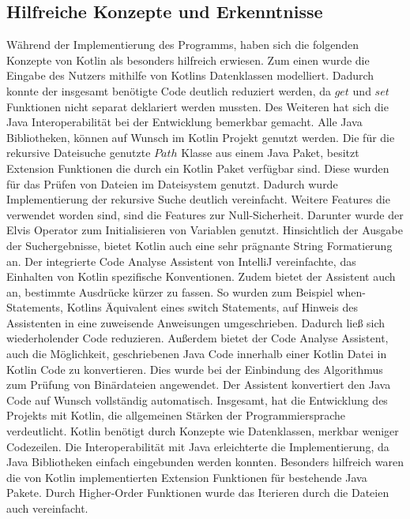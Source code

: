 \documentclass{article}
\begin{document}
\subsection{Hilfreiche Konzepte und Erkenntnisse}
Während der Implementierung des Programms, haben sich die folgenden Konzepte von Kotlin als besonders hilfreich erwiesen. Zum einen wurde die Eingabe des Nutzers mithilfe von Kotlins Datenklassen modelliert. Dadurch konnte der insgesamt benötigte Code deutlich reduziert werden, da $get$ und $set$ Funktionen nicht separat deklariert werden mussten. Des Weiteren hat sich die Java Interoperabilität bei der Entwicklung bemerkbar gemacht. Alle Java Bibliotheken, können auf Wunsch im Kotlin Projekt genutzt werden. Die für die rekursive Dateisuche genutzte $Path$ Klasse aus einem Java Paket, besitzt Extension Funktionen die durch ein Kotlin Paket verfügbar sind. Diese wurden für das Prüfen von Dateien im Dateisystem genutzt. Dadurch wurde Implementierung der rekursive Suche deutlich vereinfacht. Weitere Features die verwendet worden sind, sind die Features zur Null-Sicherheit. Darunter wurde der Elvis Operator zum Initialisieren von Variablen genutzt. Hinsichtlich der Ausgabe der Suchergebnisse, bietet Kotlin auch eine sehr prägnante String Formatierung an. \newline
Der integrierte Code Analyse Assistent von IntelliJ vereinfachte, das Einhalten von Kotlin spezifische Konventionen. Zudem bietet der Assistent auch an, bestimmte Ausdrücke kürzer zu fassen. So wurden zum Beispiel when-Statements, Kotlins Äquivalent eines switch Statements, auf Hinweis des Assistenten in eine zuweisende Anweisungen umgeschrieben. Dadurch ließ sich wiederholender Code reduzieren. Außerdem bietet der Code Analyse Assistent, auch die Möglichkeit, geschriebenen Java Code innerhalb einer Kotlin Datei in Kotlin Code zu konvertieren. Dies wurde bei der Einbindung des Algorithmus zum Prüfung von Binärdateien angewendet. Der Assistent konvertiert den Java Code auf Wunsch vollständig automatisch.\newline
Insgesamt, hat die Entwicklung des Projekts mit Kotlin, die allgemeinen Stärken der Programmiersprache verdeutlicht. Kotlin benötigt durch Konzepte wie Datenklassen, merkbar weniger Codezeilen. Die Interoperabilität mit Java erleichterte die Implementierung, da Java Bibliotheken einfach eingebunden werden konnten. Besonders hilfreich waren die von Kotlin implementierten Extension Funktionen für bestehende Java Pakete. Durch Higher-Order Funktionen wurde das Iterieren durch die Dateien auch vereinfacht.
\end{document}
